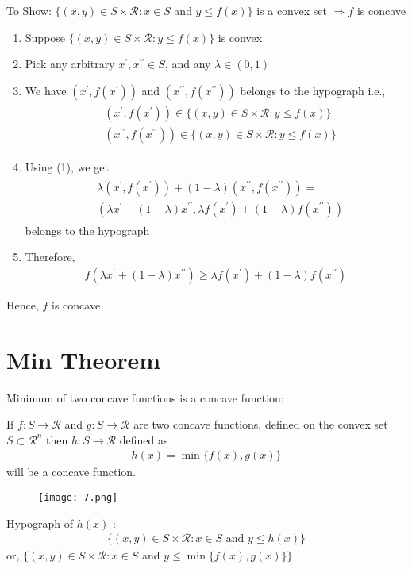 \documentclass[12pt,a4paper]{article}
\begin{document}
To Show: \(\{(x, y) \in S \times \mathcal{R}: x \in S\) and \(y \leq f(x)\}\) is a convex set \(\Longrightarrow f\) is concave
\begin{enumerate}
    \item Suppose \(\{(x, y) \in S \times \mathcal{R}: y \leq f(x)\}\) is convex
    \item Pick any arbitrary \(x^{\prime}, x^{\prime \prime} \in S\), and any \(\lambda \in(0,1)\)
    \item We have \(\left(x^{\prime}, f\left(x^{\prime}\right)\right)\) and \(\left(x^{\prime \prime}, f\left(x^{\prime \prime}\right)\right)\) belongs to the hypograph i.e.,
    \begin{align*}
    \begin{aligned}
    & \left(x^{\prime}, f\left(x^{\prime}\right)\right) \in\{(x, y) \in S \times \mathcal{R}: y \leq f(x)\} \\
    & \left(x^{\prime \prime}, f\left(x^{\prime \prime}\right)\right) \in\{(x, y) \in S \times \mathcal{R}: y \leq f(x)\}
    \end{aligned}
    \end{align*}
    \item Using (1), we get
    \begin{align*}
    \begin{aligned}
    & \lambda\left(x^{\prime}, f\left(x^{\prime}\right)\right)+(1-\lambda)\left(x^{\prime \prime}, f\left(x^{\prime \prime}\right)\right)= \\
    & \left(\lambda x^{\prime}+(1-\lambda) x^{\prime \prime}, \lambda f\left(x^{\prime}\right)+(1-\lambda) f\left(x^{\prime \prime}\right)\right)
    \end{aligned}
    \end{align*}
    belongs to the hypograph
    \item Therefore,
    \begin{align*}
    f\left(\lambda x^{\prime}+(1-\lambda) x^{\prime \prime}\right) \geq \lambda f\left(x^{\prime}\right)+(1-\lambda) f\left(x^{\prime \prime}\right)
    \end{align*}
    \end{enumerate}
Hence, \(f\) is concave
\section{Min Theorem}
Minimum of two concave functions is a concave function:

If \(f: S \rightarrow \mathcal{R}\) and \(g: S \rightarrow \mathcal{R}\) are two concave functions, defined on the convex set \(S \subset \mathcal{R}^n\) then \(h: S \rightarrow \mathcal{R}\) defined as
\begin{align*}
h(x)=\min \{f(x), g(x)\}
\end{align*}
will be a concave function.
\begin{figure}[H]
    \centering
    \texttt{[image: 7.png]}
\end{figure}
Hypograph of \(h(x)\) :
\begin{align*}
\{(x, y) \in S \times \mathcal{R}: x \in S \text { and } y \leq h(x)\}
\end{align*}
or, \(\{(x, y) \in S \times \mathcal{R}: x \in S\) and \(y \leq \min \{f(x), g(x)\}\}\)
\end{document}
